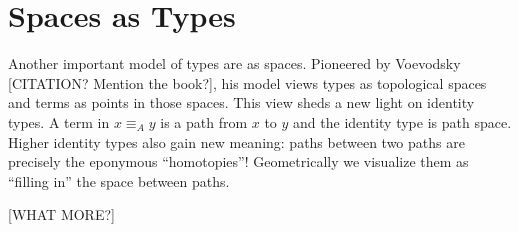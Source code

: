 \section{Spaces as Types}\label{sec:spaces}
Another important model of types are as spaces. Pioneered by Voevodsky
[CITATION? Mention the book?], his model views types as topological spaces and
terms as points in those spaces. This view sheds a new light on identity types.
A term in $x \equiv_A y$  is a path from $x$ to $y$ and the identity type is
path space. Higher identity types also gain new meaning: paths between two
paths are precisely the eponymous ``homotopies''! Geometrically we visualize
them as ``filling in'' the space between paths.

[WHAT MORE?]